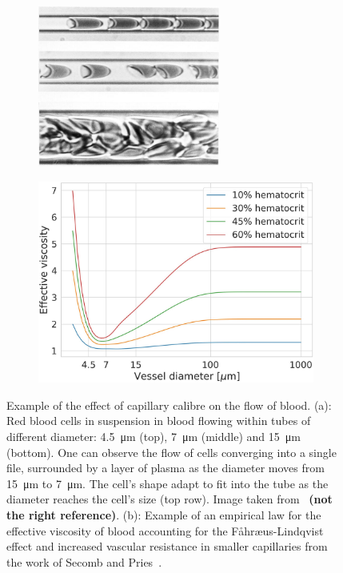 \documentclass[12pt,a4paper]{journal}
\begin{document}
\begin{figure}[t]
  \centering
  \begin{subfigure}[b]{.45\textwidth}
    \includegraphics[width=\textwidth, height=5.3cm]{cropped-RBC-in-capillaries.jpg}
    \caption{}
    \label{fig:rbc-in-tubes}
  \end{subfigure}
  \hfill
  \begin{subfigure}[b]{.45\textwidth}
    \includegraphics[width=\textwidth]{EffectiveViscosity-Secomb.jpeg}
    \caption{}
  \end{subfigure}
  \caption{Example of the effect of capillary calibre on the flow of blood. (a): Red blood cells in suspension in blood flowing within tubes of different diameter: \SI{4.5}{\micro\meter} (top), \SI{7}{\micro\meter} (middle) and \SI{15}{\micro\meter} (bottom). One can observe the flow of cells converging into a single file, surrounded by a layer of plasma as the diameter moves from \SI{15}{\micro\meter} to \SI{7}{\micro\meter}. The cell's shape adapt to fit into the tube as the diameter reaches the cell's size (top row). Image taken from~\cite{Secomb_2013} \textbf{(not the right reference)}. (b): Example of an empirical law for the effective viscosity of blood accounting for the F\r{a}hr\ae us-Lindqvist effect and increased vascular resistance in smaller capillaries from the work of Secomb and Pries~\cite{Secomb_2013}.}
  \label{fig:effectiveViscosity}
\end{figure}
\end{document}

